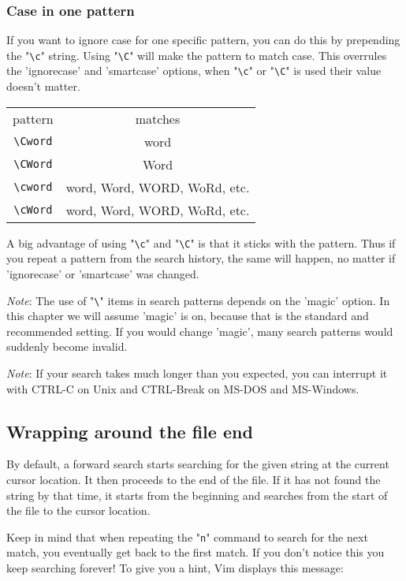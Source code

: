 \subsubsection{Case in one pattern}
If you want to ignore case for one specific pattern, you can do this by prepending the "\verb!\c!" string.
Using "\verb!\C!" will make the pattern to match case.
This overrules the 'ignorecase' and 'smartcase' options, when "\verb!\c!" or "\verb!\C!" is used their value doesn't matter.

\begin{center} \begin{tabular}{c c}
				pattern & matches \\
				\verb!\Cword! & word\\
				\verb!\CWord! & Word\\
				\verb!\cword! & word, Word, WORD, WoRd, etc.\\
				\verb!\cWord! & word, Word, WORD, WoRd, etc.\\
\end{tabular} \end{center}

A big advantage of using "\verb!\c!" and "\verb!\C!" is that it sticks with the pattern.
Thus if you repeat a pattern from the search history, the same will happen, no matter if 'ignorecase' or 'smartcase' was changed.

\emph{Note}: The use of "\verb!\!" items in search patterns depends on the 'magic' option.
In this chapter we will assume 'magic' is on, because that is the standard and recommended setting.
If you would change 'magic', many search patterns would suddenly become invalid.

\emph{Note}: If your search takes much longer than you expected, you can interrupt it with CTRL-C on Unix and  CTRL-Break on MS-DOS and MS-Windows.
\subsection{Wrapping around the file end}
By default, a forward search starts searching for the given string at the current cursor location.
It then proceeds to the end of the file.
If it has not found the string by that time, it starts from the beginning and searches from the start of the file to the cursor location.

Keep in mind that when repeating the "\verb!n!" command to search for the next match, you eventually get back to the first match.
If you don't notice this you keep searching forever!  To give you a hint, Vim displays this message:

